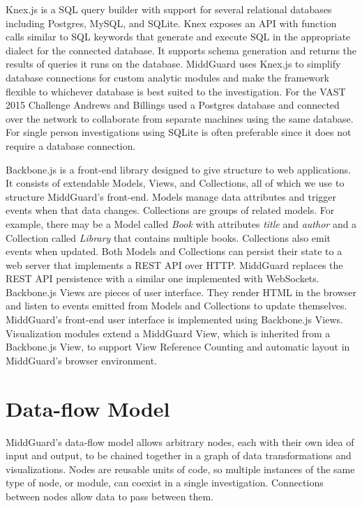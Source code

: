 \documentclass[midd]{thesis}
\begin{document}
Knex.js \cite{knexjs} is a SQL query builder with support for several relational
databases including Postgres, MySQL, and SQLite. Knex exposes an API with
function calls similar to SQL keywords that generate and execute SQL in the
appropriate dialect for the connected database. It supports schema generation
and returns the results of queries it runs on the database. MiddGuard uses
Knex.js to simplify database connections for custom analytic modules and make
the framework flexible to whichever database is best suited to the
investigation. For the VAST 2015 Challenge Andrews and Billings used a Postgres
database and connected over the network to collaborate from separate machines
using the same database. For single person investigations using SQLite is often
preferable since it does not require a database connection.

Backbone.js \cite{backbone} is a front-end library designed to give structure to
web applications. It consists of extendable Models, Views, and Collections, all
of which we use to structure MiddGuard's front-end. Models manage data
attributes and trigger events when that data changes. Collections are groups of
related models. For example, there may be a Model called \textit{Book} with
attributes \textit{title} and \textit{author} and a Collection called
\textit{Library} that contains multiple books. Collections also emit events when
updated. Both Models and Collections can persist their state to a web server
that implements a REST API over HTTP. MiddGuard replaces the REST API
persistence with a similar one implemented with WebSockets. Backbone.js Views
are pieces of user interface. They render HTML in the browser and listen to
events emitted from Models and Collections to update themselves. MiddGuard's
front-end user interface is implemented using Backbone.js Views. Visualization
modules extend a MiddGuard View, which is inherited from a Backbone.js View, to
support View Reference Counting and automatic layout in MiddGuard's browser
environment.

\section{Data-flow Model}

MiddGuard's data-flow model allows arbitrary nodes, each with their own idea of
input and output, to be chained together in a graph of data transformations and
visualizations. Nodes are reusable units of code, so multiple instances of the
same type of node, or module, can coexist in a single investigation. Connections
between nodes allow data to pass between them.
\end{document}
